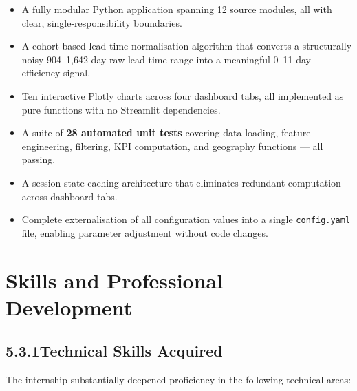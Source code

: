 \documentclass[12pt, a4paper]{report}
\begin{document}
\begin{itemize}[leftmargin=1.5em, itemsep=6pt]
  \item A fully modular Python application spanning 12 source modules,
    all with clear, single-responsibility boundaries.
  \item A cohort-based lead time normalisation algorithm that converts a
    structurally noisy 904--1{,}642 day raw lead time range into a
    meaningful 0--11 day efficiency signal.
  \item Ten interactive Plotly charts across four dashboard tabs, all
    implemented as pure functions with no Streamlit dependencies.
  \item A suite of \textbf{28 automated unit tests} covering data loading,
    feature engineering, filtering, KPI computation, and geography
    functions — all passing.
  \item A session state caching architecture that eliminates redundant
    computation across dashboard tabs.
  \item Complete externalisation of all configuration values into a
    single \texttt{config.yaml} file, enabling parameter adjustment
    without code changes.
\end{itemize}

\section{Skills and Professional Development}

\subsection*{5.3.1\quad Technical Skills Acquired}

The internship substantially deepened proficiency in the following technical
areas:
\end{document}
